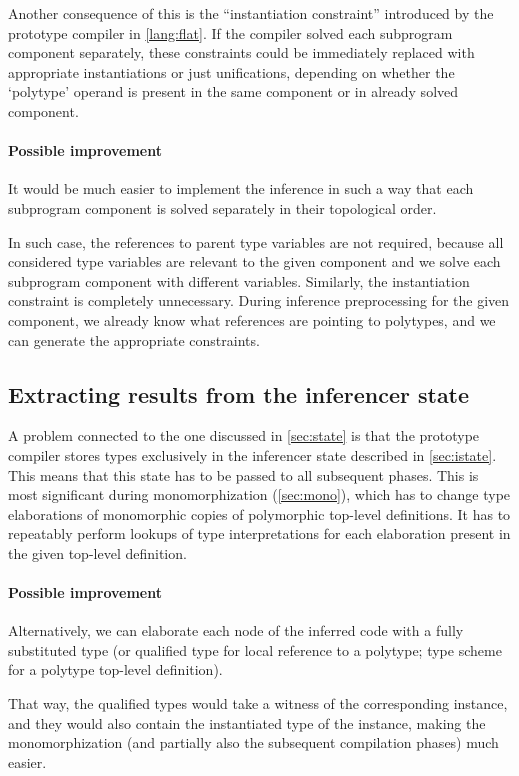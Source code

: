 Another consequence of this is the ``instantiation constraint'' introduced by the prototype compiler in \cref{lang:flat}. If the compiler solved each subprogram component separately, these constraints could be immediately replaced with appropriate instantiations or just unifications, depending on whether the `polytype' operand is present in the same component or in already solved component.

\paragraph{Possible improvement}
It would be much easier to implement the inference in such a way that each subprogram component is solved separately in their topological order.

In such case, the references to parent type variables are not required, because all considered type variables are relevant to the given component and we solve each subprogram component with different variables. Similarly, the instantiation constraint is completely unnecessary. During inference preprocessing for the given component, we already know what references are pointing to polytypes, and we can generate the appropriate constraints.

\subsection{Extracting results from the inferencer state}
\label{sec:inferInter}

A problem connected to the one discussed in \cref{sec:state} is that the prototype compiler stores types exclusively in the inferencer state described in \cref{sec:istate}. This means that this state has to be passed to all subsequent phases. This is most significant during monomorphization (\cref{sec:mono}), which has to change type elaborations of monomorphic copies of polymorphic top-level definitions. It has to repeatably perform lookups of type interpretations for each elaboration present in the given top-level definition.

\paragraph{Possible improvement}
Alternatively, we can elaborate each node of the inferred code with a fully substituted type (or qualified type for local reference to a polytype; type scheme for a polytype top-level definition).

That way, the qualified types would take a witness of the corresponding instance, and they would also contain the instantiated type of the instance, making the monomorphization (and partially also the subsequent compilation phases) much easier.

